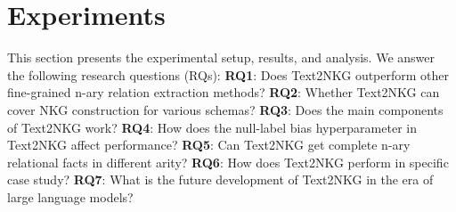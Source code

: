 \documentclass{article} \usepackage{iclr2024_conference,times}
\begin{document}
\begin{table*}[t]
\centering
\scriptsize
{}
\caption{\label{t2}
Dataset statistics, where the columns indicate the number of entities, relations with four schema, sentences and n-ary relational facts in all sets, train set, dev set, and test set,respectively.
}
\end{table*}


\section{Experiments}

This section presents the experimental setup, results, and analysis. We answer the following research questions (RQs):
\textbf{RQ1}: Does Text2NKG outperform other fine-grained n-ary relation extraction methods?
\textbf{RQ2}: Whether Text2NKG can cover NKG construction for various schemas?
\textbf{RQ3}: Does the main components of Text2NKG work?
\textbf{RQ4}: How does the null-label bias hyperparameter in Text2NKG affect performance?
\textbf{RQ5}: Can Text2NKG get complete n-ary relational facts in different arity?
\textbf{RQ6}: How does Text2NKG perform in specific case study?
\textbf{RQ7}: What is the future development of Text2NKG in the era of large language models?
\end{document}
